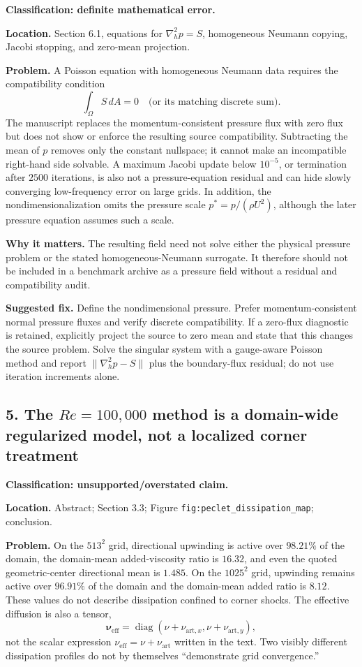 \documentclass[11pt]{article}
\begin{document}
\textbf{Classification: definite mathematical error.}

\textbf{Location.} Section 6.1, equations for $\nabla_h^2p=S$, homogeneous Neumann copying, Jacobi stopping, and zero-mean projection.

\textbf{Problem.} A Poisson equation with homogeneous Neumann data requires the compatibility condition
\[
\int_\Omega S\,dA=0
\quad\text{(or its matching discrete sum).}
\]
The manuscript replaces the momentum-consistent pressure flux with zero flux but does not show or enforce the resulting source compatibility.  Subtracting the mean of $p$ removes only the constant nullspace; it cannot make an incompatible right-hand side solvable.  A maximum Jacobi update below $10^{-5}$, or termination after $2500$ iterations, is also not a pressure-equation residual and can hide slowly converging low-frequency error on large grids.  In addition, the nondimensionalization omits the pressure scale $p^*=p/(\rho U^2)$, although the later pressure equation assumes such a scale.

\textbf{Why it matters.} The resulting field need not solve either the physical pressure problem or the stated homogeneous-Neumann surrogate.  It therefore should not be included in a benchmark archive as a pressure field without a residual and compatibility audit.

\textbf{Suggested fix.} Define the nondimensional pressure.  Prefer momentum-consistent normal pressure fluxes and verify discrete compatibility.  If a zero-flux diagnostic is retained, explicitly project the source to zero mean and state that this changes the source problem.  Solve the singular system with a gauge-aware Poisson method and report $\|\nabla_h^2p-S\|$ plus the boundary-flux residual; do not use iteration increments alone.

\subsection*{5. The $Re=100{,}000$ method is a domain-wide regularized model, not a localized corner treatment}

\textbf{Classification: unsupported/overstated claim.}

\textbf{Location.} Abstract; Section 3.3; Figure \texttt{fig:peclet\_dissipation\_map}; conclusion.

\textbf{Problem.} On the $513^2$ grid, directional upwinding is active over $98.21\%$ of the domain, the domain-mean added-viscosity ratio is $16.32$, and even the quoted geometric-center directional mean is $1.485$.  On the $1025^2$ grid, upwinding remains active over $96.91\%$ of the domain and the domain-mean added ratio is $8.12$.  These values do not describe dissipation confined to corner shocks.  The effective diffusion is also a tensor,
\[
\boldsymbol{\nu}_{\mathrm{eff}}
=\operatorname{diag}(\nu+\nu_{\mathrm{art},x},
                     \nu+\nu_{\mathrm{art},y}),
\]
not the scalar expression $\nu_{\mathrm{eff}}=\nu+\nu_{\mathrm{art}}$ written in the text.  Two visibly different dissipation profiles do not by themselves ``demonstrate grid convergence.''
\end{document}
